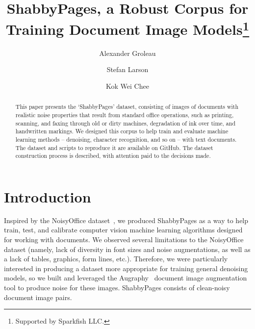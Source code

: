 \documentclass[runningheads]{llncs}
\begin{document}
\title{ShabbyPages, a Robust Corpus for Training Document Image Models\thanks{Supported by Sparkfish LLC.}}

\author{Alexander Groleau \and
  Stefan Larson \and
  Kok Wei Chee}

%
\maketitle

\begin{abstract}
This paper presents the ‘ShabbyPages’ dataset, consisting of images of documents with realistic noise properties that result from standard office operations, such as printing, scanning, and faxing through old or dirty machines, degradation of ink over time, and handwritten markings. We designed this corpus to help train and evaluate machine learning methods -- denoising, character recognition, and so on -- with text documents. The dataset and scripts to reproduce it are available on GitHub. The dataset construction process is described, with attention paid to the decisions made.

\end{abstract}

\section{Introduction}
Inspired by the NoisyOffice dataset~\cite{ref_noisy}, we produced ShabbyPages as a way to help train, test, and calibrate computer vision machine learning algorithms designed for working with documents. We observed several limitations to the NoisyOffice dataset (namely, lack of diversity in font sizes and noise augmentations, as well as a lack of tables, graphics, form lines, etc.). Therefore, we were particularly interested in producing a dataset more appropriate for training general denoising models, so we built and leveraged the Augraphy~\cite{ref_augraphy} document image augmentation tool to produce noise for these images. ShabbyPages consists of  clean-noisy document image pairs.
\end{document}
